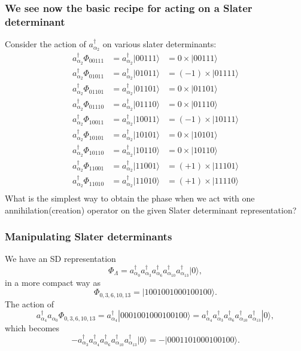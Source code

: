 \documentclass[compress]{beamer}
\newcommand*{\ket}[1]{|#1\rangle}
\begin{document}
\frame
{
  \frametitle{We see now the basic recipe for acting on a Slater determinant}
\begin{small}
{\scriptsize
Consider the action of $a^\dagger_{\alpha_2}$ on various slater determinants:
\[
\begin{array}{ccc}
a^\dagger_{\alpha_2}\Phi_{00111}& = a^\dagger_{\alpha_2}|00111\rangle&=0\times |00111\rangle\\
a^\dagger_{\alpha_2}\Phi_{01011}& = a^\dagger_{\alpha_2}|01011\rangle&=(-1)\times |01111\rangle\\
a^\dagger_{\alpha_2}\Phi_{01101}& = a^\dagger_{\alpha_2}|01101\rangle&=0\times |01101\rangle\\
a^\dagger_{\alpha_2}\Phi_{01110}& = a^\dagger_{\alpha_2}|01110\rangle&=0\times |01110\rangle\\
a^\dagger_{\alpha_2}\Phi_{10011}& = a^\dagger_{\alpha_2}|10011\rangle&=(-1)\times |10111\rangle\\
a^\dagger_{\alpha_2}\Phi_{10101}& = a^\dagger_{\alpha_2}|10101\rangle&=0\times |10101\rangle\\
a^\dagger_{\alpha_2}\Phi_{10110}& = a^\dagger_{\alpha_2}|10110\rangle&=0\times |10110\rangle\\
a^\dagger_{\alpha_2}\Phi_{11001}& = a^\dagger_{\alpha_2}|11001\rangle&=(+1)\times |11101\rangle\\
a^\dagger_{\alpha_2}\Phi_{11010}& = a^\dagger_{\alpha_2}|11010\rangle&=(+1)\times |11110\rangle\\
\end{array}
\]
What is the simplest way to obtain the phase when we act with one annihilation(creation) operator
on the given Slater determinant representation?
}
\end{small}
}


\frame
{
  \frametitle{Manipulating Slater determinants}
\begin{small}
{\scriptsize
We have an SD representation
\[
\Phi_{\Lambda} = a_{\alpha_0}^\dagger a_{\alpha_3}^\dagger a_{\alpha_6}^\dagger a_{\alpha_{10}}^\dagger a_{\alpha_{13}}^\dagger \ket{0},
\]
in a more compact way as 
\[
\Phi_{0,3,6,10,13} = |1001001000100100\rangle.
\]
The action of 
\[
a^\dagger_{\alpha_4}a_{\alpha_0}\Phi_{0,3,6,10,13} = a^\dagger_{\alpha_4}|0001001000100100\rangle=a^\dagger_{\alpha_4}a_{\alpha_3}^\dagger a_{\alpha_6}^\dagger a_{\alpha_{10}}^\dagger a_{\alpha_{13}}^\dagger \ket{0},
\]
which becomes
\[
-a_{\alpha_3}^\dagger a^\dagger_{\alpha_4} a_{\alpha_6}^\dagger a_{\alpha_{10}}^\dagger a_{\alpha_{13}}^\dagger \ket{0}=-|0001101000100100\rangle.
\]
}
\end{small}
}
\end{document}
